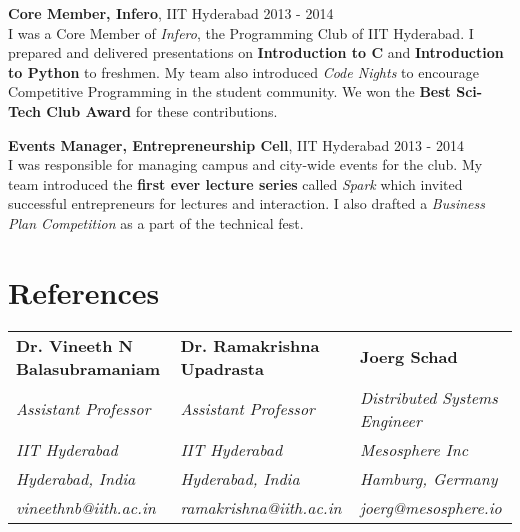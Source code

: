 \documentclass[margin,line]{res}
\begin{document}
\begin{resume}
  {\bf Core Member, Infero}, IIT Hyderabad \hfill 2013 - 2014 \\
  	I was a Core Member of {\it Infero}, the Programming Club of IIT Hyderabad. I prepared and delivered presentations on {\bf Introduction to C} and {\bf Introduction to Python} to freshmen. My team also introduced {\it Code Nights} to encourage Competitive Programming in the student community. We won the {\bf Best Sci-Tech Club Award} for these contributions.

  \vspace*{-2.5mm}

  {\bf Events Manager, Entrepreneurship Cell}, IIT Hyderabad \hfill 2013 - 2014 \\
    I was responsible for managing campus and city-wide events for the club. My team introduced the {\bf first ever lecture series} called {\it Spark} which invited successful entrepreneurs for lectures and interaction. I also drafted a {\it Business Plan Competition} as a part of the technical fest.

\section{\sc References}

  \begin{tabular}{@{}p{1.85in}p{2in}p{2in}}

  {\bf Dr. Vineeth N \newline Balasubramaniam } & {\bf Dr. Ramakrishna \newline Upadrasta} & {\bf Joerg Schad} \\
        {\it Assistant Professor} & {\it Assistant Professor} & {\it Distributed Systems Engineer} \\
        {\it IIT Hyderabad} & {\it IIT Hyderabad} & {\it Mesosphere Inc} \\
        {\it Hyderabad, India} & {\it Hyderabad, India} & {\it Hamburg, Germany} \\
        {\it vineethnb@iith.ac.in} & {\it ramakrishna@iith.ac.in} & {\it joerg@mesosphere.io} \\

  \end{tabular}

\end{resume}
\end{document}
